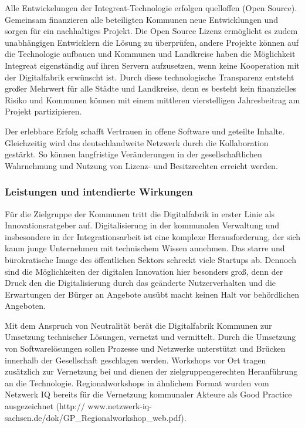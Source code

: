 \documentclass[12pt, a4paper]{article} %
\begin{document}
Alle Entwickelungen der Integreat-Technologie erfolgen quelloffen (Open
Source). Gemeinsam finanzieren alle beteiligten Kommunen neue
Entwicklungen und sorgen für ein nachhaltiges Projekt. Die Open Source
Lizenz ermöglicht es zudem unabhängigen Entwicklern die Lösung zu
überprüfen, andere Projekte können auf die Technologie aufbauen und
Kommunen und Landkreise haben die Möglichkeit Integreat eigenständig auf
ihren Servern aufzusetzen, wenn keine Kooperation mit der Digitalfabrik
erwünscht ist. Durch diese technologische Transparenz entsteht großer
Mehrwert für alle Städte und Landkreise, denn es besteht kein
finanzielles Risiko und Kommunen können mit einem mittleren
vierstelligen Jahresbeitrag am Projekt partizipieren.

Der erlebbare Erfolg schafft Vertrauen in offene Software und geteilte
Inhalte. Gleichzeitig wird das deutschlandweite Netzwerk durch die
Kollaboration gestärkt. So können langfristige Veränderungen in der
gesellschaftlichen Wahrnehmung und Nutzung von Lizenz- und Besitzrechten
erreicht werden.

\hypertarget{leistungen-und-intendierte-wirkungen}{%
\subsubsection{Leistungen und intendierte
Wirkungen}\label{leistungen-und-intendierte-wirkungen}}

Für die Zielgruppe der Kommunen tritt die Digitalfabrik in erster Linie
als Innovationsratgeber auf. Digitalisierung in der kommunalen
Verwaltung und insbesondere in der Integrationsarbeit ist eine komplexe
Herausforderung, der sich kaum junge Unternehmen mit technischem Wissen
annehmen. Das starre und bürokratische Image des öffentlichen Sektors
schreckt viele Startups ab. Dennoch sind die Möglichkeiten der digitalen
Innovation hier besonders groß, denn der Druck den die Digitalisierung
durch das geänderte Nutzerverhalten und die Erwartungen der Bürger an
Angebote ausübt macht keinen Halt vor behördlichen Angeboten.

Mit dem Anspruch von Neutralität berät die Digitalfabrik Kommunen zur
Umsetzung technischer Lösungen, vernetzt und vermittelt. Durch die
Umsetzung von Softwarelösungen sollen Prozesse und Netzwerke unterstützt
und Brücken innerhalb der Gesellschaft geschlagen werden. Workshops vor
Ort tragen zusätzlich zur Vernetzung bei und dienen der
zielgruppengerechten Heranführung an die Technologie. Regionalworkshops
in ähnlichem Format wurden vom Netzwerk IQ bereits für die Vernetzung
kommunaler Akteure als Good Practice ausgezeichnet (http://
www.netzwerk-iq-sachsen.de/dok/GP\_Regionalworkshop\_web.pdf).
\end{document}
